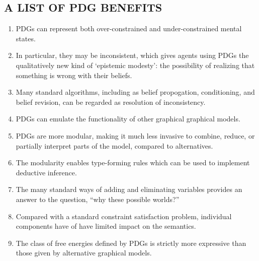 \subsection{A LIST OF PDG BENEFITS}\label{sec:list-of-benefits}
\begin{enumerate}[nosep]
	\item PDGs can represent both over-constrained and under-constrained mental states. 
	\item In particular, they may be inconsistent, which gives agents using PDGs the qualitatively new kind of `epistemic modesty': the possibility of realizing that something is wrong with their beliefs.
	\item Many standard algorithms, including as belief propogation, conditioning, and belief revision, can be regarded as resolution of inconsistency.
	\item PDGs can emulate the functionality of other graphical graphical models.
	\item PDGs are more modular, making it much less invasive to combine, reduce, or partially interpret parts of the model, compared to alternatives.
	\item The modularity enables type-forming rules which can be used to implement deductive inference.
	\item The many standard ways of adding and eliminating variables provides an answer to the question, ``why these possible worlds?''
	\item Compared with a standard constraint satisfaction problem, individual components have of have limited impact on the semantics.
	\item The class of free energies defined by PDGs is strictly more expressive than those given by alternative graphical models.
\end{enumerate} %

